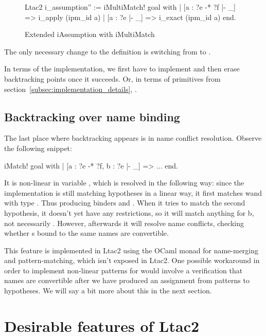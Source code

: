 \begin{itemize}
\begin{figure}[H]
\begin{coq}
Ltac2 i_assumption'' :=
  iMultiMatch! goal with
  | [a : ?e -* ?f |- _] => i_apply (ipm_id a)
  | [a : ?e |- _] => i_exact (ipm_id a)
  end.
\end{coq}
  \caption{Extended iAssumption with iMultiMatch}
  \label{fig:iassumption-multi}
\end{figure}
The only necessary change to the  definition is switching from  to .

In terms of the implementation, we first have to implement  and then erase backtracking points once it succeeds.
Or, in terms of primitives from section~\ref{subsec:implementation_details}, .
\end{itemize}

\subsection{Backtracking over name binding}

The last place where backtracking appears is in name conflict resolution.
Observe the following snippet:

\begin{coq}
iMatch! goal with
| [a : ?e -* ?f, b : ?e |- _] => ...
end.
\end{coq}

It is non-linear in variable , which is resolved in the following way:
since the implementation is still matching hypotheses in a linear way, it first matches wand  with type .
Thus producing binders  and .
When it tries to match the second hypothesis, it doesn't yet have any restrictions, so it will match anything for b, not necessarily .
However, afterwards it will resolve name conflicts, checking whether s bound to the same names are convertible.

This feature is implemented in Ltac2 using the OCaml monad for name-merging and pattern-matching, which isn't exposed in Ltac2.
One possible workaround in order to implement non-linear patterns for  would involve a verification that names are convertible after we have produced an assignment from patterns to hypotheses.
We will say a bit more about this in the next section.

\section{Desirable features of Ltac2}
\label{sec:desir-feat-ltac2-five}


